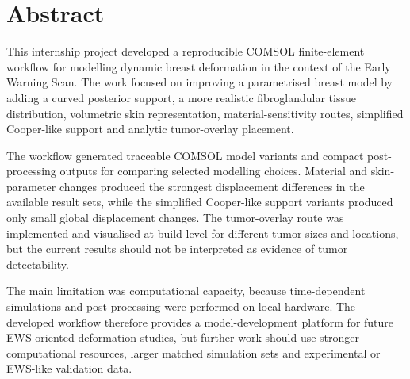\section{Abstract}

This internship project developed a reproducible COMSOL finite-element workflow for modelling dynamic breast deformation in the context of the Early Warning Scan. The work focused on improving a parametrised breast model by adding a curved posterior support, a more realistic fibroglandular tissue distribution, volumetric skin representation, material-sensitivity routes, simplified Cooper-like support and analytic tumor-overlay placement.

The workflow generated traceable COMSOL model variants and compact post-processing outputs for comparing selected modelling choices. Material and skin-parameter changes produced the strongest displacement differences in the available result sets, while the simplified Cooper-like support variants produced only small global displacement changes. The tumor-overlay route was implemented and visualised at build level for different tumor sizes and locations, but the current results should not be interpreted as evidence of tumor detectability.

The main limitation was computational capacity, because time-dependent simulations and post-processing were performed on local hardware. The developed workflow therefore provides a model-development platform for future EWS-oriented deformation studies, but further work should use stronger computational resources, larger matched simulation sets and experimental or EWS-like validation data.